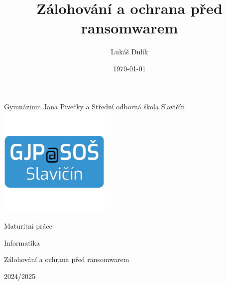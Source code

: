 \documentclass[a4paper,12pt, oneside]{book}
\title{Zálohování a ochrana před ransomwarem}
\author{Lukáš Dulík}
\date{\today} %
\def\topic{Zálohování a ochrana před ransomwarem}
\begin{document}

\begin{titlepage}
    \begin{center}

        \large
		Gymnázium Jana Pivečky a Střední odborná škola Slavičín \\

		\includegraphics[width=0.4\textwidth]{img/gjp.png}

        \vspace{0.2cm}

        {\LARGE Maturitní práce}

        \vspace{0.4cm}

        {\large Informatika}

        \vspace{3.5cm}

        \LARGE
        \topic

	\vspace{1.5cm}

	\vfill

	\vspace{0.8cm}

	\vspace{5pt}
	\vspace{6pt}

	\Large

	\makeatletter
		 \@author 

	\vspace{0.1cm}
		 
		 2024/2025

	\makeatother

	\vspace{5pt}

    \end{center}

\end{titlepage}
\end{document}
